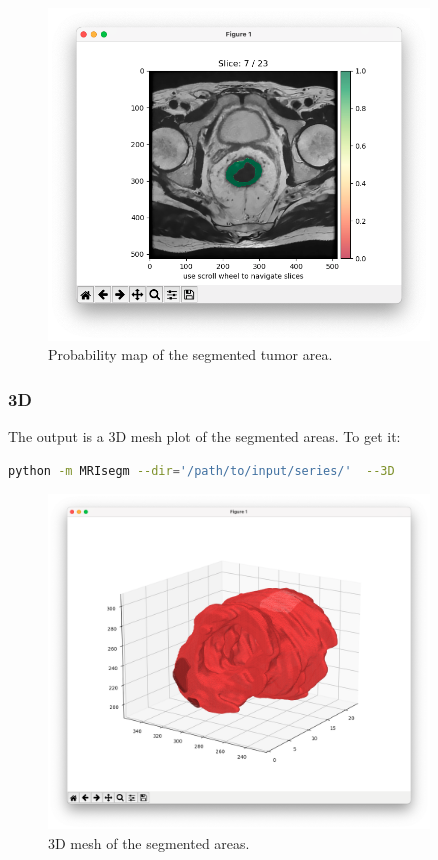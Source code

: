 \documentclass{standalone}
\begin{document}
\begin{figure}[ht]

    \centering
    \includegraphics[width=0.9\textwidth]{../images/example_density.png}

    \caption{Probability map of the segmented tumor area.}
    \label{density}
    
\end{figure}

\clearpage
\newpage

\subsubsection{3D}

The output is a 3D mesh plot of the segmented areas.
To get it:

\begin{lstlisting}[language = bash]
python -m MRIsegm --dir='/path/to/input/series/'  --3D
\end{lstlisting}

\begin{figure}[ht]

    \centering
    \includegraphics[width=0.9\textwidth]{../images/example_3D.png}

    \caption{3D mesh of the segmented areas.}
    \label{3D}
    
\end{figure}
\end{document}
